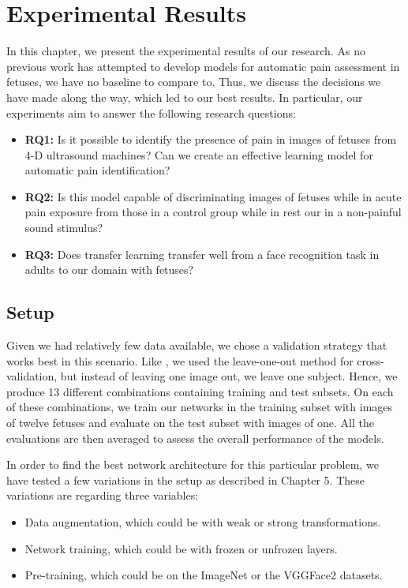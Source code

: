 \chapter{Experimental Results}

In this chapter, we present the experimental results of our research. As no previous work has attempted to develop models for automatic pain assessment in fetuses, we have no baseline to compare to. Thus, we discuss the decisions we have made along the way, which led to our best results. In particular, our experiments aim to answer the following research questions:

\begin{itemize}
    \item \textbf{RQ1:} Is it possible to identify the presence of pain in images of fetuses from 4-D ultrasound machines? Can we create an effective learning model for automatic pain identification?
    
    \item \textbf{RQ2:} Is this model capable of discriminating images of fetuses while in acute pain exposure from those in a control group while in rest our in a non-painful sound stimulus?
    
    \item \textbf{RQ3:} Does transfer learning transfer well from a face recognition task in adults to our domain with fetuses?
\end{itemize}

\section{Setup}

Given we had relatively few data available, we chose a validation strategy that works best in this scenario. Like \cite{CelonaM17}, we used the leave-one-out method for cross-validation, but instead of leaving one image out, we leave one subject. Hence, we produce 13 different combinations containing training and test subsets. On each of these combinations, we train our networks in the training subset with images of twelve fetuses and evaluate on the test subset with images of one. All the evaluations are then averaged to assess the overall performance of the models.

In order to find the best network architecture for this particular problem, we have tested a few variations in the setup as described in Chapter 5. These variations are regarding three variables:

\begin{itemize}
    \item Data augmentation, which could be with weak or strong transformations.

    \item Network training, which could be with frozen or unfrozen layers.

    \item Pre-training, which could be on the ImageNet or the VGGFace2 datasets.
\end{itemize}


